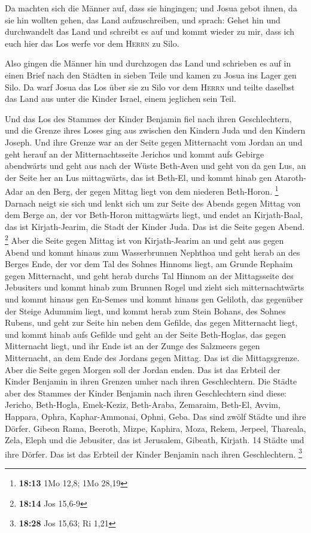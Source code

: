 Da machten sich die Männer auf, dass sie hingingen; und
Josua gebot ihnen, da sie hin wollten gehen, das Land aufzuschreiben,
und sprach: Gehet hin und durchwandelt das Land und schreibt es auf und
kommt wieder zu mir, dass ich euch hier das Los werfe vor dem
\textsc{Herrn} zu Silo.

 Also gingen die Männer hin und durchzogen das Land und
schrieben es auf in einen Brief nach den Städten in sieben Teile und
kamen zu Josua ins Lager gen Silo.  Da warf Josua das Los
über sie zu Silo vor dem \textsc{Herrn} und teilte daselbst das Land aus
unter die Kinder Israel, einem jeglichen sein Teil.

 Und das Los des Stammes der Kinder Benjamin fiel nach
ihren Geschlechtern, und die Grenze ihres Loses ging aus zwischen den
Kindern Juda und den Kindern Joseph.  Und ihre Grenze war
an der Seite gegen Mitternacht vom Jordan an und geht herauf an der
Mitternachtsseite Jerichos und kommt aufs Gebirge abendwärts und geht
aus nach der Wüste Beth-Aven  und geht von da gen Lus, an
der Seite her an Lus mittagwärts, das ist Beth-El, und kommt hinab gen
Ataroth-Adar an den Berg, der gegen Mittag liegt von dem niederen
Beth-Horon. \footnote{\textbf{18:13} 1Mo 12,8; 1Mo 28,19}
 Darnach neigt sie sich und lenkt sich um zur Seite des
Abends gegen Mittag von dem Berge an, der vor Beth-Horon mittagwärts
liegt, und endet an Kirjath-Baal, das ist Kirjath-Jearim, die Stadt der
Kinder Juda. Das ist die Seite gegen Abend. \footnote{\textbf{18:14} Jos
  15,6-9}  Aber die Seite gegen Mittag ist von
Kirjath-Jearim an und geht aus gegen Abend und kommt hinaus zum
Wasserbrunnen Nephthoa  und geht herab an des Berges
Ende, der vor dem Tal des Sohnes Hinnoms liegt, am Grunde Rephaim gegen
Mitternacht, und geht herab durchs Tal Hinnom an der Mittagsseite des
Jebusiters und kommt hinab zum Brunnen Rogel  und zieht
sich mitternachtwärts und kommt hinaus gen En-Semes und kommt hinaus gen
Geliloth, das gegenüber der Steige Adummim liegt, und kommt herab zum
Stein Bohans, des Sohnes Rubens,  und geht zur Seite hin
neben dem Gefilde, das gegen Mitternacht liegt, und kommt hinab aufs
Gefilde  und geht an der Seite Beth-Hoglas, das gegen
Mitternacht liegt, und ihr Ende ist an der Zunge des Salzmeers gegen
Mitternacht, an dem Ende des Jordans gegen Mittag. Das ist die
Mittagsgrenze.  Aber die Seite gegen Morgen soll der
Jordan enden. Das ist das Erbteil der Kinder Benjamin in ihren Grenzen
umher nach ihren Geschlechtern.  Die Städte aber des
Stammes der Kinder Benjamin nach ihren Geschlechtern sind diese:
Jericho, Beth-Hogla, Emek-Keziz,  Beth-Araba, Zemaraim,
Beth-El,  Avvim, Happara, Ophra, 
Kaphar-Ammonai, Ophni, Geba. Das sind zwölf Städte und ihre Dörfer.
 Gibeon Rama, Beeroth,  Mizpe, Kaphira,
Moza,  Rekem, Jerpeel, Thareala,  Zela,
Eleph und die Jebusiter, das ist Jerusalem, Gibeath, Kirjath. 14 Städte
und ihre Dörfer. Das ist das Erbteil der Kinder Benjamin nach ihren
Geschlechtern. \footnote{\textbf{18:28} Jos 15,63; Ri 1,21}

